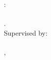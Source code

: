 \thispagestyle{empty}

\hfill

\vfill

\noindent\spacedlowsmallcaps{\myName}: \\
\textit{\myTitle} \\
{\small\textit{\mySubtitle}}. \\[\baselineskip]
\noindent Supervised by: \\
{\spacedlowsmallcaps{\myProf}} \\[\baselineskip]
\myLocation, \myTime
